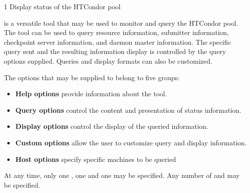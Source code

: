 \begin{ManPage}{\label{man-condor-status}}{1}
{Display status of the HTCondor pool}
\Synopsis {}
\ToolDebugOption
{}


\Description
{} is a versatile tool that may be used to monitor and query the 
HTCondor pool.  The  tool can be used to query resource 
information, submitter information, checkpoint server information, and daemon
master information.  The specific query sent and the resulting information 
display is controlled by the query options supplied.  Queries and display 
formats can also be customized.

The options that may be supplied to  belong to five groups:
\begin{itemize}
	\item \textbf{Help options} provide information about the 
		tool.
	\item \textbf{Query options} control the content and presentation of status
		information.
	\item \textbf{Display options} control the display of the queried 
		information.
	\item \textbf{Custom options} allow the user to customize query and
		display information.
	\item \textbf{Host options} specify specific machines to be queried
\end{itemize}

At any time, only one , one  and one
 may be specified.  
Any number of  and  may be specified.


\end{ManPage}
